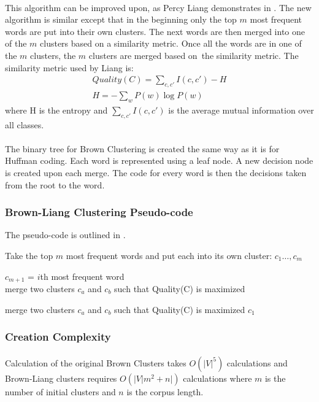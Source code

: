 \paragraph{}
This algorithm can be improved upon, as Percy Liang demonstrates in \cite{Liang2005}. The new algorithm is similar except that in the beginning only the top $m$ most frequent words are put into their own clusters. The next words are then merged into one of the $m$ clusters based on a similarity metric. Once all the words are in one of the $m$ clusters, the $m$ clusters are merged based on~the similarity metric.
The similarity metric used by Liang is:
\begin{align}
Quality(C) = \sum_{c,c'} I(c,c') - H
\\
H= -\sum_w P(w) \log P(w) \nonumber
\end{align}
where H is the entropy and $\sum_{c,c'} I(c,c')$ is the average mutual information over all classes.
\paragraph{}
The binary tree for Brown Clustering is created the same way as it is for Huffman coding. Each word is represented using a leaf node. A new decision node is created upon each merge. The code for every word is then the decisions taken from the root to the word.

\subsubsection{Brown-Liang Clustering Pseudo-code}
The pseudo-code is outlined in \cite{Collins2011}.
\begin{algorithm}
\SetAlgoLined
Take the top $m$ most frequent words and put each into its own cluster: $c_1\dots,c_m$

 {
	$c_{m+1}$ = $i$th most frequent word
	\\
	merge two clusters $c_a$ and $c_b$ such that Quality(C) is maximized
	
}
 {
merge two clusters $c_a$ and $c_b$ such that Quality(C) is maximized
}
\Return $c_1$
\end{algorithm}

\subsubsection{Creation Complexity}
\paragraph{}
Calculation of the original Brown Clusters takes $O(|V|^5)$ calculations and Brown-Liang clusters requires $O(|V| m^2+n|)$ calculations where $m$ is the number of initial clusters and $n$ is the corpus length.  

